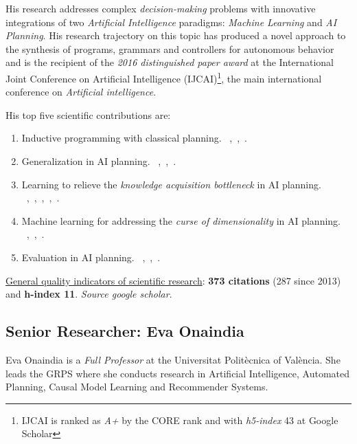 \documentclass[10pt,a4paper]{paper}
\begin{document}
His research addresses complex {\em decision-making} problems with innovative integrations of two {\em Artificial Intelligence} paradigms: {\em Machine Learning} and {\em AI Planning}. His research trajectory on this topic has produced a novel approach to the synthesis of programs, grammars and controllers for autonomous behavior and is the recipient of the {\it 2016 distinguished paper award} at the International Joint Conference on Artificial Intelligence (IJCAI)\footnote{IJCAI is ranked as {\it A+} by the CORE rank and with {\it h5-index} 43 at Google Scholar}, the main international conference on {\em Artificial intelligence}.

His top five scientific contributions are:
\begin{enumerate}
\item Inductive programming with classical planning. {\footnotesize~\cite{javi-ijcai17},~\cite{segovia2016generalized},~\cite{jimenez2015computing}}.
\item Generalization in AI planning. {\footnotesize~\cite{javi-icaps17},~\cite{damir-derived-ijcai16},~\cite{javi-fsc-ijcai16}}.
\item Learning to relieve the {\it knowledge acquisition bottleneck} in AI planning. {\footnotesize{~\cite{diego-icaps18},~\cite{jimenez2013integrating},~\cite{jimenez2008architecture},~\cite{jimenez2006planning},~\cite{lanchas2007learning}}}.
\item Machine learning for addressing the {\it curse of dimensionality} in AI planning. {\footnotesize~\cite{jimenez2012review},~\cite{de2011scaling},~\cite{de2008learning}}.  
\item Evaluation in AI planning. {\footnotesize~\cite{lopez2015deterministic},~\cite{lopez2013automating},~\cite{coles2012survey}}. 
\end{enumerate}

\underline{General quality indicators of scientific research}: {\bf 373 citations} (287 since 2013) and {\bf h-index 11}. {\scriptsize\em Source google scholar}.


\subsection{Senior Researcher: Eva Onaindia}

Eva Onaindia is a {\em Full Professor} at the Universitat Politècnica of València. She leads the GRPS where she conducts research in Artificial Intelligence, Automated Planning, Causal Model Learning and Recommender Systems.
\end{document}
